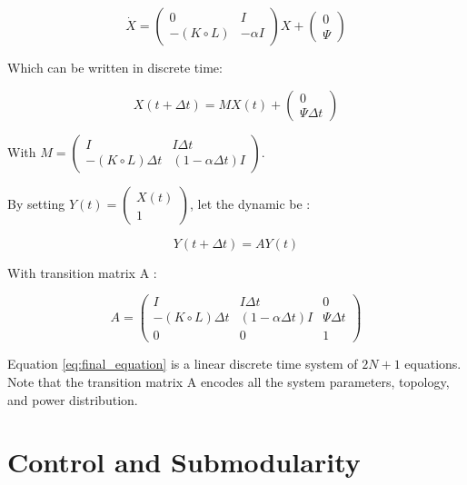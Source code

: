 \documentclass[conference]{IEEEtran}
\begin{document}
\begin{equation}
 \dot{X} = \left( \begin{array}{cc} 0 & I \\ - (K \circ L) & -\alpha I \end{array} \right) X + \left( \begin{array}{c} 0 \\ \Psi \end{array} \right)
\end{equation}
 
Which can be written in discrete time: 

\begin{equation} 
X(t+\Delta t) = M  X(t) +  \left( \begin{array}{c} 0 \\ \Psi \Delta t \end{array} \right)
\end{equation} 

With $ M = \left( \begin{array}{cc} I & I \Delta t \\ -(K \circ L) \Delta t & (1-\alpha \Delta t) I \end{array} \right) $.

By setting $ Y(t) =  \left( \begin{array}{c} X(t) \\ 1 \end{array} \right) $, let the dynamic be :

\begin{equation}
\label{eq:final_equation}
 Y(t+\Delta t) = A Y(t)
\end{equation}

With transition matrix A :

\begin{equation}
 A =   \left( \begin{array}{ccc} I & I \Delta t & 0 \\ -(K \circ L) \Delta t & (1-\alpha \Delta t)I & \Psi \Delta t \\ 0&0&1 \end{array} \right)
\end{equation}

Equation \ref{eq:final_equation} is a linear discrete time system of $ 2 N + 1 $ equations. Note that the transition matrix A encodes all the system parameters, topology, and power distribution.



\section{Control and Submodularity}
\label{sec:control_and_submodularity}
\end{document}
